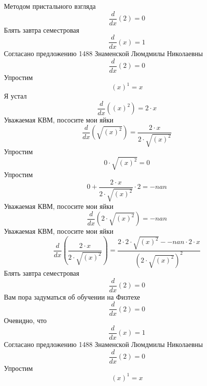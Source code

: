 \documentclass[12pt, a4paper]{article}
\begin{document}
Методом пристального взгляда
\begin{equation}
\frac{d}{dx}(2) = 0
\end{equation}
Блять завтра семестровая
\begin{equation}
\frac{d}{dx}(x) = 1
\end{equation}
Согласано предложению 1488 Знаменской Люмдмилы Николаевны
\begin{equation}
\frac{d}{dx}(2) = 0
\end{equation}
Упростим
\begin{equation}
{(x)}^{1} = x
\end{equation}
Я устал
\begin{equation}
\frac{d}{dx}({(x)}^{2}) = 2 \cdot x
\end{equation}
Уважаемая КВМ, пососите мои яйки
\begin{equation}
\frac{d}{dx}(\sqrt{{(x)}^{2}}) = \frac{2 \cdot x}{2 \cdot \sqrt{{(x)}^{2}}}
\end{equation}
Упростим
\begin{equation}
0 \cdot \sqrt{{(x)}^{2}} = 0
\end{equation}
Упростим
\begin{equation}
0+\frac{2 \cdot x}{2 \cdot \sqrt{{(x)}^{2}}} \cdot 2 = -nan
\end{equation}
Уважаемая КВМ, пососите мои яйки
\begin{equation}
\frac{d}{dx}(2 \cdot \sqrt{{(x)}^{2}}) = -nan
\end{equation}
Уважаемая КВМ, пососите мои яйки
\begin{equation}
\frac{d}{dx}(\frac{2 \cdot x}{2 \cdot \sqrt{{(x)}^{2}}}) = \frac{2 \cdot 2 \cdot \sqrt{{(x)}^{2}}--nan \cdot 2 \cdot x}{{(2 \cdot \sqrt{{(x)}^{2}})}^{2}}
\end{equation}
Блять завтра семестровая
\begin{equation}
\frac{d}{dx}(2) = 0
\end{equation}
Вам пора задуматься об обучении на Физтехе
\begin{equation}
\frac{d}{dx}(2) = 0
\end{equation}
Очевидно, что
\begin{equation}
\frac{d}{dx}(x) = 1
\end{equation}
Согласано предложению 1488 Знаменской Люмдмилы Николаевны
\begin{equation}
\frac{d}{dx}(2) = 0
\end{equation}
Упростим
\begin{equation}
{(x)}^{1} = x
\end{equation}
\end{document}
